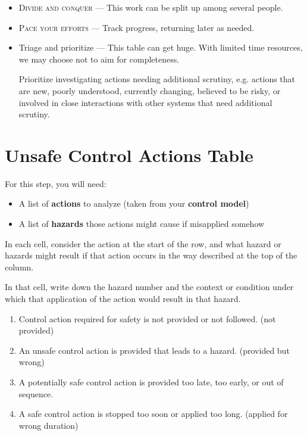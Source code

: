 \documentclass[letterpaper]{tufte-book}
\begin{document}

\begin{itemize}
\setlength{\itemsep}{0pt}
\setlength{\parskip}{.25em}
\item \textsc{Divide and conquer} --- This work can be split up among several people.
\item \textsc{Pace your efforts} --- Track progress, returning later as needed.
\item Triage and prioritize --- This table can get huge. With limited time resources, we may choose not to aim for completeness.

Prioritize investigating actions needing additional scrutiny, e.g. actions that are new, poorly understood, currently changing, believed to be risky, or involved in close interactions with other systems that need additional scrutiny.
\end{itemize}  

\section{Unsafe Control Actions Table}


For this step, you will need:
\begin{itemize}
\item A list of \textbf{actions} to analyze (taken from your \textbf{control model})
\item A list of \textbf{hazards} those actions might cause if misapplied somehow
\end{itemize}

In each cell, consider the action at the start of the row, and what hazard or hazards might result if that action occurs in the way described at the top of the column. 

In that cell, write down the hazard number and the context or condition under which that application of the action would result in that hazard.

\begin{enumerate}
\item Control action \hbox{required} for safety is not provided or not followed. (not provided)
\item An unsafe control action is provided that leads to a hazard.  (provided but wrong)
\item A potentially safe control action is provided too late, too early, or out of sequence.
\item A safe control action is stopped too soon or applied too long. (applied for wrong duration)
\end{enumerate}
\end{document}
